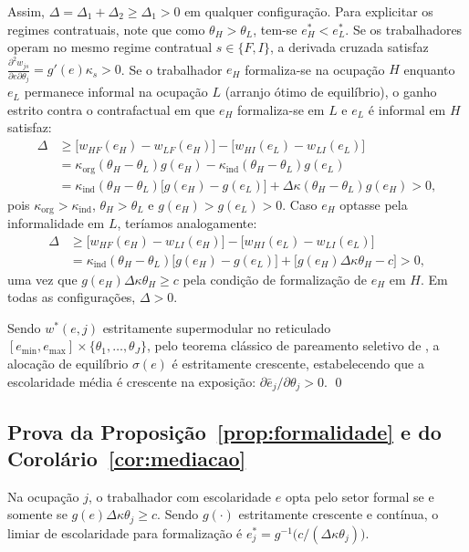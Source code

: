 Assim, $\Delta = \Delta_1 + \Delta_2 \ge \Delta_1 > 0$ em qualquer configuração. Para explicitar os regimes contratuais, note que como $\theta_H > \theta_L$, tem-se $e_H^* < e_L^*$. Se os trabalhadores operam no mesmo regime contratual $s \in \{F, I\}$, a derivada cruzada satisfaz $\frac{\partial^2 w_{js}}{\partial e \partial \theta_j} = g'(e)\kappa_s > 0$. Se o trabalhador $e_H$ formaliza-se na ocupação $H$ enquanto $e_L$ permanece informal na ocupação $L$ (arranjo ótimo de equilíbrio), o ganho estrito contra o contrafactual em que $e_H$ formaliza-se em $L$ e $e_L$ é informal em $H$ satisfaz:
\begin{align}
    \Delta &\ge \big[w_{HF}(e_H) - w_{LF}(e_H)\big] - \big[w_{HI}(e_L) - w_{LI}(e_L)\big] \nonumber \\
    &= \kappa_{\text{org}}(\theta_H - \theta_L)g(e_H) - \kappa_{\text{ind}}(\theta_H - \theta_L)g(e_L) \nonumber \\
    &= \kappa_{\text{ind}}(\theta_H - \theta_L)\big[g(e_H) - g(e_L)\big] + \Delta\kappa(\theta_H - \theta_L)g(e_H) > 0,
\end{align}
pois $\kappa_{\text{org}} > \kappa_{\text{ind}}$, $\theta_H > \theta_L$ e $g(e_H) > g(e_L) > 0$. Caso $e_H$ optasse pela informalidade em $L$, teríamos analogamente:
\begin{align}
    \Delta &\ge \big[w_{HF}(e_H) - w_{LI}(e_H)\big] - \big[w_{HI}(e_L) - w_{LI}(e_L)\big] \nonumber \\
    &= \kappa_{\text{ind}}(\theta_H - \theta_L)\big[g(e_H) - g(e_L)\big] + \big[g(e_H)\Delta\kappa\theta_H - c\big] > 0,
\end{align}
uma vez que $g(e_H)\Delta\kappa\theta_H \ge c$ pela condição de formalização de $e_H$ em $H$. Em todas as configurações, $\Delta > 0$.

Sendo $w^*(e, j)$ estritamente supermodular no reticulado $[e_{\min}, e_{\max}] \times \{\theta_1, \dots, \theta_J\}$, pelo teorema clássico de pareamento seletivo de \citet{becker1973theory}, a alocação de equilíbrio $\sigma(e)$ é estritamente crescente, estabelecendo que a escolaridade média é crescente na exposição: $\partial \bar{e}_j / \partial \theta_j > 0$. \qed

\subsection{Prova da Proposição~\ref{prop:formalidade} e do Corolário~\ref{cor:mediacao}}

Na ocupação $j$, o trabalhador com escolaridade $e$ opta pelo setor formal se e somente se $g(e)\Delta\kappa\theta_j \ge c$. Sendo $g(\cdot)$ estritamente crescente e contínua, o limiar de escolaridade para formalização é $e^*_j = g^{-1}\big(c / (\Delta\kappa \theta_j)\big)$.

